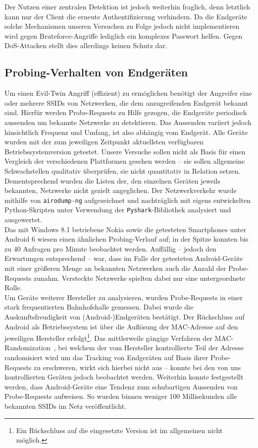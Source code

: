 Der Nutzen einer zentralen Detektion ist jedoch weiterhin fraglich, denn letztlich kann nur der Client die erneute Authentifizierung verhindern. Da die Endgeräte solche Mechanismen unseren Versuchen zu Folge jedoch nicht implementieren wird gegen Bruteforce-Angriffe lediglich ein komplexes Passwort helfen. Gegen DoS-Attacken stellt dies allerdings keinen Schutz dar.

\subsection{Probing-Verhalten von Endgeräten}\label{subs:praxisprobes}
Um einen Evil-Twin Angriff (effizient) zu ermöglichen benötigt der Angreifer eine oder mehrere SSIDs von Netzwerken, die dem anzugreifenden Endgerät bekannt sind.
Hierfür werden Probe-Requests zu Hilfe gezogen, die Endgeräte periodisch aussenden um bekannte Netzwerke zu detektieren.
Das Aussenden variiert jedoch hinsichtlich Frequenz und Umfang, ist also abhängig vom Endgerät.
Alle Geräte wurden mit der zum jeweiligen Zeitpunkt aktuellsten verfügbaren Betriebssystemversion getestet. Unsere Versuche sollen nicht als Basis für einen Vergleich der verschiedenen Plattformen gesehen werden -- sie sollen allgemeine Schwachstellen qualitativ überprüfen, sie nicht quantitativ in Relation setzen. Dementsprechend wurden die Listen der, den einzelnen Geräten jeweils bekannten, Netzwerke nicht gezielt angeglichen. Der Netzwerkverkehr wurde mithilfe von \texttt{airodump-ng} aufgezeichnet und nachträglich mit eigens entwickelten Python-Skripten unter Verwendung der \texttt{Pyshark}-Bibliothek analysiert und ausgewertet.\\

Das mit Windows 8.1 betriebene Nokia sowie die getesteten Smartphones unter Android 6 wiesen einen ähnlichen Probing-Verlauf auf; in der Spitze konnten bis zu 40 Anfragen pro Minute beobachtet werden.
Auffällig -- jedoch den Erwartungen entsprechend -- war, dass im Falle der getesteten Android-Geräte mit einer größeren Menge an bekannten Netzwerken auch die Anzahl der Probe-Requests zunahm. Versteckte Netzwerke spielten dabei nur eine untergeordnete Rolle.\\

Um Geräte weiterer Hersteller zu analysieren, wurden Probe-Requests in einer stark frequentierten Bahnhofshalle gemessen. Dabei wurde die Auskunftsfreudigkeit von (Android-)Endgeräten bestätigt. Der Rückschluss auf Android als Betriebssystem ist über die Auflösung der MAC-Adresse auf den jeweiligen Hersteller erfolgt\footnote{Ein Rückschluss auf die eingesetzte Version ist im allgemeinen nicht möglich.}.
Das mittlerweile gängige Verfahren der MAC-Randomization~\cite{android6changes, windows10wireless}, bei welchem der vom Hersteller kontrollierte Teil der Adresse randomisiert wird um das Tracking von Endgeräten auf Basis ihrer Probe-Requests zu erschweren, wirkt sich hierbei nicht aus -- konnte bei den von uns kontrollierten Geräten jedoch beobachtet werden.
Weiterhin konnte festgestellt werden, dass Android-Geräte eine Tendenz zum schubartigen Aussenden von Probe-Requests aufweisen.
So wurden binnen weniger 100 Millisekunden alle bekannten SSIDs im Netz veröffentlicht.\\

